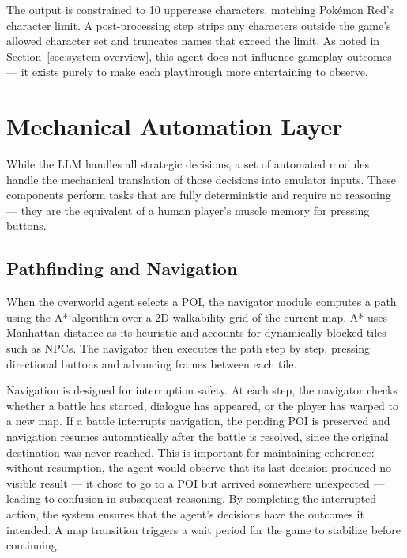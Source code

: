 \documentclass{article}
\begin{document}
The output is constrained to 10 uppercase characters, matching Pok\'{e}mon Red's character limit. A post-processing step strips any characters outside the game's allowed character set and truncates names that exceed the limit. As noted in Section~\ref{sec:system-overview}, this agent does not influence gameplay outcomes --- it exists purely to make each playthrough more entertaining to observe.


\section{Mechanical Automation Layer}
\label{sec:automation}

While the LLM handles all strategic decisions, a set of automated modules handle the mechanical translation of those decisions into emulator inputs. These components perform tasks that are fully deterministic and require no reasoning --- they are the equivalent of a human player's muscle memory for pressing buttons.

\subsection{Pathfinding and Navigation}

When the overworld agent selects a POI, the navigator module computes a path using the A* algorithm over a 2D walkability grid of the current map. A* uses Manhattan distance as its heuristic and accounts for dynamically blocked tiles such as NPCs. The navigator then executes the path step by step, pressing directional buttons and advancing frames between each tile.

Navigation is designed for interruption safety. At each step, the navigator checks whether a battle has started, dialogue has appeared, or the player has warped to a new map. If a battle interrupts navigation, the pending POI is preserved and navigation resumes automatically after the battle is resolved, since the original destination was never reached. This is important for maintaining coherence: without resumption, the agent would observe that its last decision produced no visible result --- it chose to go to a POI but arrived somewhere unexpected --- leading to confusion in subsequent reasoning. By completing the interrupted action, the system ensures that the agent's decisions have the outcomes it intended. A map transition triggers a wait period for the game to stabilize before continuing.
\end{document}
